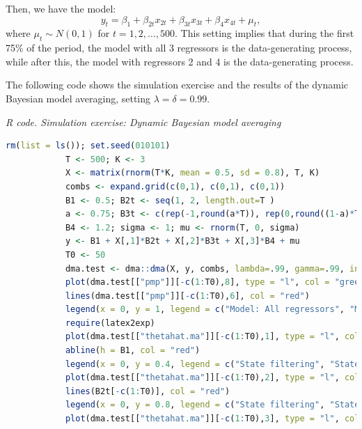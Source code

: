Then, we have the model:
\[
y_t = \beta_1 + \beta_{2t} x_{2t} + \beta_{3t} x_{3t} + \beta_4 x_{4t} + \mu_t, 
\]
where $\mu_t \sim N(0,1)$ for $t = 1, 2, \dots, 500$. This setting implies that during the first 75\% of the period, the model with all 3 regressors is the data-generating process, while after this, the model with regressors 2 and 4 is the data-generating process.

The following code shows the simulation exercise and the results of the dynamic Bayesian model averaging, setting $\lambda = \delta = 0.99$.

\begin{tcolorbox}[enhanced,width=4.67in,center upper,
	fontupper=\large\bfseries,drop shadow southwest,sharp corners]
	\textit{R code. Simulation exercise: Dynamic Bayesian model averaging}
	\begin{VF}
		\begin{lstlisting}[language=R]
			rm(list = ls()); set.seed(010101)
			T <- 500; K <- 3
			X <- matrix(rnorm(T*K, mean = 0.5, sd = 0.8), T, K)
			combs <- expand.grid(c(0,1), c(0,1), c(0,1))
			B1 <- 0.5; B2t <- seq(1, 2, length.out=T )
			a <- 0.75; B3t <- c(rep(-1,round(a*T)), rep(0,round((1-a)*T)))
			B4 <- 1.2; sigma <- 1; mu <- rnorm(T, 0, sigma)
			y <- B1 + X[,1]*B2t + X[,2]*B3t + X[,3]*B4 + mu
			T0 <- 50
			dma.test <- dma::dma(X, y, combs, lambda=.99, gamma=.99, initialperiod = T0)
			plot(dma.test[["pmp"]][-c(1:T0),8], type = "l", col = "green", main = "Posterior model probability: Model all regressors vs model regressors 2 and 4", xlab = "Time", ylab = "PMP")
			lines(dma.test[["pmp"]][-c(1:T0),6], col = "red")
			legend(x = 0, y = 1, legend = c("Model: All regressors", "Model: Regressors 2 and 4"), col = c("green", "red"), lty=1:1, cex=0.8)
			require(latex2exp)
			plot(dma.test[["thetahat.ma"]][-c(1:T0),1], type = "l", col = "green", main = "Bayesian model average filtering recursion", xlab = "Time", ylab = TeX("$\\beta_{1}$"))
			abline(h = B1, col = "red")
			legend(x = 0, y = 0.4, legend = c("State filtering", "State population"), col = c("green", "red"), lty=1:1, cex=0.8)
			plot(dma.test[["thetahat.ma"]][-c(1:T0),2], type = "l", col = "green", main = "Bayesian model average filtering recursion", xlab = "Time", ylab = TeX("$\\beta_{2t}$"), ylim = c(0.5,2))
			lines(B2t[-c(1:T0)], col = "red")
			legend(x = 0, y = 0.8, legend = c("State filtering", "State population"), col = c("green", "red"), lty=1:1, cex=0.8)
			plot(dma.test[["thetahat.ma"]][-c(1:T0),3], type = "l", col = "green", main = "Bayesian model average filtering recursion", xlab = "Time", ylab = TeX("$\\beta_{3t}$"))

\end{lstlisting}
\end{VF}
\end{tcolorbox}
